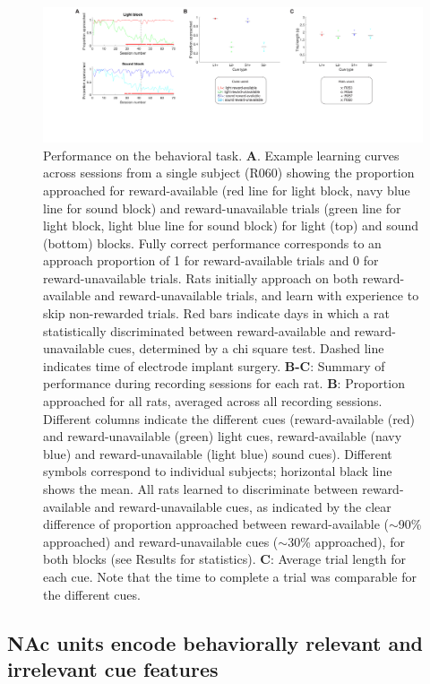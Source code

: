 \documentclass[11pt]{article}
\newcommand{\bsf}[1]{\textbf{#1}}
\begin{document}
{\begin{figure}[h]
\centering
\includegraphics[width=\textwidth]{Fig 4 - Behavioral results.png}
\caption{Performance on the behavioral task. \bsf{A}. Example learning curves
across sessions from a single subject (R060) showing the proportion approached
for reward-available (red line for light block, navy blue line for sound
block) and reward-unavailable trials (green line for light block, light blue
line for sound block) for light (top) and sound (bottom) blocks. Fully correct performance corresponds to an approach
proportion of 1 for reward-available trials and 0 for reward-unavailable
trials. Rats initially approach on both reward-available and
reward-unavailable trials, and learn with experience to skip non-rewarded
trials. Red bars indicate days in which a rat statistically discriminated
between reward-available and reward-unavailable cues, determined by a chi
square test. Dashed line indicates time of electrode implant
surgery. \bsf{B-C}: Summary of performance during recording sessions for each
rat. \bsf{B}: Proportion approached for all rats, averaged across all
recording sessions. Different columns indicate the different cues
(reward-available (red) and reward-unavailable (green) light cues,
reward-available (navy blue) and reward-unavailable (light blue) sound
cues). Different symbols correspond to individual subjects; horizontal black
line shows the mean. All rats learned to discriminate between reward-available
and reward-unavailable cues, as indicated by the clear difference of
proportion approached between reward-available ($\sim$90\% approached) and
reward-unavailable cues ($\sim$30\% approached), for both blocks (see Results
for statistics). \bsf{C}: Average trial length for each cue. Note that the
time to complete a trial was comparable for the different cues.}
\label{fig:behav}
\end{figure}

\subsection*{NAc units encode behaviorally relevant and irrelevant cue features}

}
\end{document}
